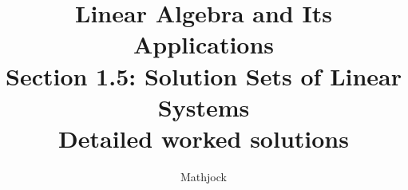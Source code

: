 
\title{\textbf{Linear Algebra and Its Applications}\\[0.3em]Section 1.5: Solution Sets of Linear Systems\\[0.3em]\large Detailed worked solutions}
\author{Mathjock}
\date{}

\maketitle
\bookinfo
\tableofcontents
\clearpage
\renewcommand{\thesection}{1.\arabic{section}}
\renewcommand{\theHsection}{1.\arabic{section}}
\setcounter{section}{4}


